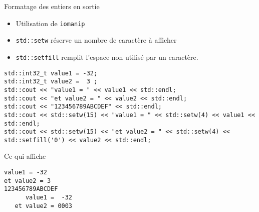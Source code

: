 \documentclass[compress,10pt,aspectratio=169]{beamer}
\begin{document}
\begin{frame}[fragile]{Formatage des entiers en sortie}
\scriptsize 
\begin{itemize}
\item Utilisation de \texttt{iomanip}
\item \texttt{std::setw} réserve un nombre de caractère à afficher
\item \texttt{std::setfill} remplit l'espace non utilisé par un caractère.
\end{itemize}
\begin{verbatim}
std::int32_t value1 = -32;
std::int32_t value2 =  3 ;
std::cout << "value1 = " << value1 << std::endl;
std::cout << "et value2 = " << value2 << std::endl;
std::cout << "123456789ABCDEF" << std::endl;
std::cout << std::setw(15) << "value1 = " << std::setw(4) << value1 << std::endl;
std::cout << std::setw(15) << "et value2 = " << std::setw(4) << std::setfill('0') << value2 << std::endl;
\end{verbatim}

Ce qui affiche 
\begin{tcolorbox}[colback=black,coltext=white]
\begin{verbatim}
value1 = -32
et value2 = 3
123456789ABCDEF
      value1 =  -32
   et value2 = 0003
\end{verbatim}
\end{tcolorbox}
\end{frame}
\end{document}

